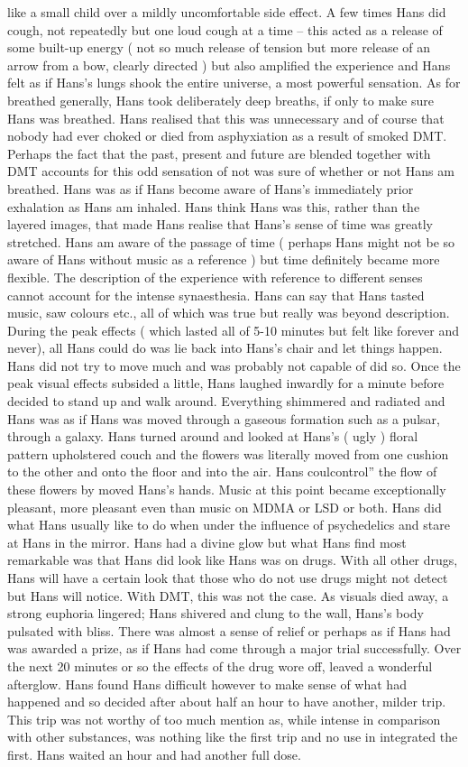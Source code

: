 \documentclass[12pt]{book}
\begin{document}
like a small child over a mildly uncomfortable side effect. A few times Hans did cough, not repeatedly but one loud cough at a time -- this acted as a release of some built-up energy ( not so much release of tension but more release of an arrow from a bow, clearly directed ) but also amplified the experience and Hans felt as if Hans's lungs shook the entire universe, a most powerful sensation. As for breathed generally, Hans took deliberately deep breaths, if only to make sure Hans was breathed. Hans realised that this was unnecessary and of course that nobody had ever choked or died from asphyxiation as a result of smoked DMT. Perhaps the fact that the past, present and future are blended together with DMT accounts for this odd sensation of not was sure of whether or not Hans am breathed. Hans was as if Hans become aware of Hans's immediately prior exhalation as Hans am inhaled. Hans think Hans was this, rather than the layered images, that made Hans realise that Hans's sense of time was greatly stretched. Hans am aware of the passage of time ( perhaps Hans might not be so aware of Hans without music as a reference ) but time definitely became more flexible. The description of the experience with reference to different senses cannot account for the intense synaesthesia. Hans can say that Hans tasted music, saw colours etc., all of which was true but really was beyond description. During the peak effects ( which lasted all of 5-10 minutes but felt like forever and never), all Hans could do was lie back into Hans's chair and let things happen. Hans did not try to move much and was probably not capable of did so. Once the peak visual effects subsided a little, Hans laughed inwardly for a minute before decided to stand up and walk around. Everything shimmered and radiated and Hans was as if Hans was moved through a gaseous formation such as a pulsar, through a galaxy. Hans turned around and looked at Hans's ( ugly ) floral pattern upholstered couch and the flowers was literally moved from one cushion to the other and onto the floor and into the air. Hans coulcontrol'' the flow of these flowers by moved Hans's hands. Music at this point became exceptionally pleasant, more pleasant even than music on MDMA or LSD or both. Hans did what Hans usually like to do when under the influence of psychedelics and stare at Hans in the mirror. Hans had a divine glow but what Hans find most remarkable was that Hans did look like Hans was on drugs. With all other drugs, Hans will have a certain look that those who do not use drugs might not detect but Hans will notice. With DMT, this was not the case. As visuals died away, a strong euphoria lingered; Hans shivered and clung to the wall, Hans's body pulsated with bliss. There was almost a sense of relief or perhaps as if Hans had was awarded a prize, as if Hans had come through a major trial successfully. Over the next 20 minutes or so the effects of the drug wore off, leaved a wonderful afterglow. Hans found Hans difficult however to make sense of what had happened and so decided after about half an hour to have another, milder trip. This trip was not worthy of too much mention as, while intense in comparison with other substances, was nothing like the first trip and no use in integrated the first. Hans waited an hour and had another full dose. 
\end{document}
